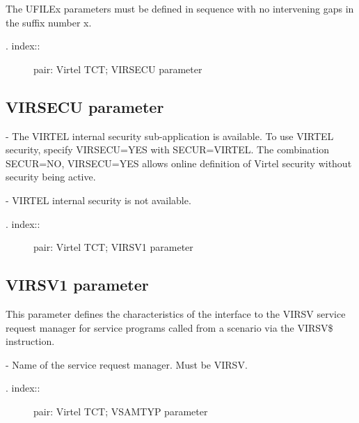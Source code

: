 \documentclass[letterpaper,10pt,english]{sphinxmanual}
\begin{document}
The UFILEx parameters must be defined in sequence with no intervening gaps in the suffix number x.
\begin{description}
\item[{. index::}] \leavevmode
pair: Virtel TCT; VIRSECU parameter

\end{description}


\subsection{VIRSECU parameter}
\label{\detokenize{Installation_Guide:virsecu-parameter}}
\begin{sphinxVerbatim}[commandchars=\\\{\}]
 
\end{sphinxVerbatim}

 - The VIRTEL internal security sub-application is available. To use VIRTEL security, specify VIRSECU=YES with SECUR=VIRTEL. The combination SECUR=NO, VIRSECU=YES allows online definition of Virtel security without security being active.

 - VIRTEL internal security is not available.
\begin{description}
\item[{. index::}] \leavevmode
pair: Virtel TCT; VIRSV1 parameter

\end{description}


\subsection{VIRSV1 parameter}
\label{\detokenize{Installation_Guide:virsv1-parameter}}
\begin{sphinxVerbatim}[commandchars=\\\{\}]
 
\end{sphinxVerbatim}

This parameter defines the characteristics of the interface to the VIRSV service request manager for service programs called from a scenario via the VIRSV\$ instruction.

 - Name of the service request manager. Must be VIRSV.
\begin{description}
\item[{. index::}] \leavevmode
pair: Virtel TCT; VSAMTYP parameter

\end{description}
\end{document}
